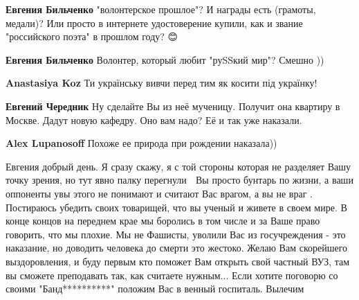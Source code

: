 \begin{itemize}
\begin{itemize}
\textbf{Евгения Бильченко} "волонтерское прошлое"? И награды есть (грамоты, медали)? Или просто в интернете удостоверение купили, как и звание "российского поэта" в прошлом году? 😊

 
\textbf{Евгения Бильченко} Волонтер, который любит "руSSкий мир"? Смешно ))

 
\textbf{Anastasiya Koz} Ти українську вивчи перед тим як косити під українку!

 
\textbf{Евгений Чередник} Ну сделайте Вы из неё мученицу. Получит она квартиру в Москве. Дадут новую кафедру. Оно вам надо? Её и так уже наказали.

 
\textbf{Alex Lupanosoff} Похоже ее природа при рождении наказала))


\end{itemize}

 
Евгения добрый день. Я сразу скажу, я с той стороны которая не разделяет Вашу
точку зрения, но тут явно палку перегнули 🙁 Вы просто бунтарь по жизни, а ваши
оппоненты увы этого не понимают и считают Вас врагом, а вы не враг \Smiley[1.0][yellow] .
Постираюсь убедить своих товарищей, что вы ученый и живете в своем мире. В
конце концов на переднем крае мы боролись в том числе и за Ваше право говорить,
что мы плохие. Мы не Фашисты, уволили Вас из госучреждения - это наказание, но
доводить человека до смерти это жестоко. Желаю Вам скорейшего выздоровления, и
буду первым кто поможет Вам открыть свой частный ВУЗ, там вы сможете
преподавать так, как считаете нужным... Если хотите поговорю со своими
"Банд**********" положим Вас в венный госпиталь. Вылечим \Smiley[1.0][yellow]


\end{itemize}
